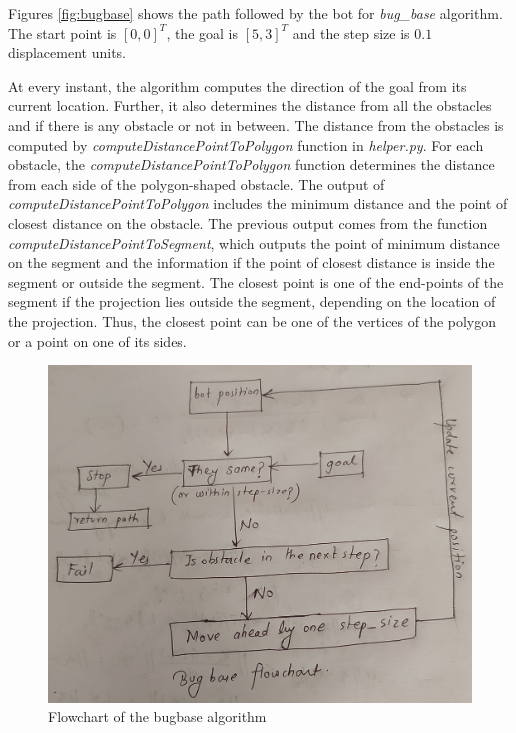 \documentclass[a4paper, 11pt, letterpaper]{article}
\begin{document}
Figures \ref{fig:bugbase} shows the path followed by the bot for \textit{bug\_base} algorithm. The start point is $\left[0,0\right]^T$, the goal is $\left[5,3\right]^T$ and the step size is $0.1$ displacement units.

At every instant, the algorithm computes the direction of the goal from its current location. Further, it also determines the distance from all the obstacles and if there is any obstacle or not in between. The distance from the obstacles is computed by \textit{computeDistancePointToPolygon} function in \textit{helper.py}. For each obstacle, the \textit{computeDistancePointToPolygon} function determines the distance from each side of the polygon-shaped obstacle. The output of \textit{computeDistancePointToPolygon} includes the minimum distance and the point of closest distance on the obstacle. The previous output comes from the function \textit{computeDistancePointToSegment}, which outputs the point of minimum distance on the segment and the information if the point of closest distance is inside the segment or outside the segment. The closest point is one of the end-points of the segment if the projection lies outside the segment, depending on the location of the projection. Thus, the closest point can be one of the vertices of the polygon or a point on one of its sides.

\begin{figure}
	\centering
	\includegraphics[scale = 0.08]{plots/flowBugBase.jpg}
	\caption{\footnotesize{Flowchart of the bugbase algorithm}}
	\label{fig:flowBugBase}
\end{figure}
\end{document}
